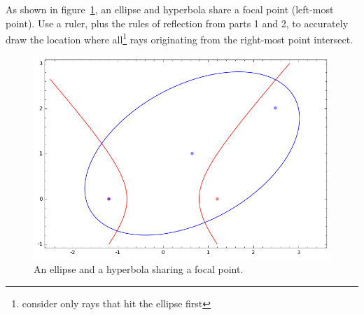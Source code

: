 As shown in figure~\ref{fig:both}, an ellipse and hyperbola share a focal point (left-most point).
Use a ruler, plus the rules of reflection from parts 1 and 2, to accurately draw the location where all\footnote{consider only rays that hit the ellipse first} rays originating from the right-most point intersect.
%
\begin{figure}[!h]
\centering
\includegraphics[scale=0.85]{figures/optics-mirrors/both.png}
\caption{An ellipse and a hyperbola sharing a focal point.}
\label{fig:both}
\end{figure}

\pagebreak \clearpage
